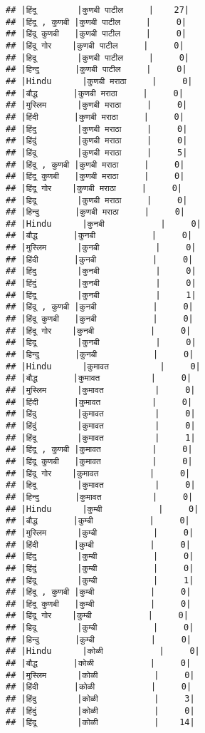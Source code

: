 \documentclass[
]{article}
\begin{document}
\begin{verbatim}
## |हिंदू        |कुणबी पाटील     |    27|
## |हिंदू , कुणबी |कुणबी पाटील     |     0|
## |हिंदू कुणबी   |कुणबी पाटील     |     0|
## |हिंदू गोर    |कुणबी पाटील     |     0|
## |हिदू        |कुणबी पाटील     |     0|
## |हिन्दु       |कुणबी पाटील     |     0|
## |Hindu      |कुणबी मराठा     |     0|
## |बौद्ध       |कुणबी मराठा     |     0|
## |मुस्लिम      |कुणबी मराठा     |     0|
## |हिंदी       |कुणबी मराठा     |     0|
## |हिंदु        |कुणबी मराठा     |     0|
## |हिंदुं        |कुणबी मराठा     |     0|
## |हिंदू        |कुणबी मराठा     |     5|
## |हिंदू , कुणबी |कुणबी मराठा     |     0|
## |हिंदू कुणबी   |कुणबी मराठा     |     0|
## |हिंदू गोर    |कुणबी मराठा     |     0|
## |हिदू        |कुणबी मराठा     |     0|
## |हिन्दु       |कुणबी मराठा     |     0|
## |Hindu      |कुनबी           |     0|
## |बौद्ध       |कुनबी           |     0|
## |मुस्लिम      |कुनबी           |     0|
## |हिंदी       |कुनबी           |     0|
## |हिंदु        |कुनबी           |     0|
## |हिंदुं        |कुनबी           |     0|
## |हिंदू        |कुनबी           |     1|
## |हिंदू , कुणबी |कुनबी           |     0|
## |हिंदू कुणबी   |कुनबी           |     0|
## |हिंदू गोर    |कुनबी           |     0|
## |हिदू        |कुनबी           |     0|
## |हिन्दु       |कुनबी           |     0|
## |Hindu      |कुमावत          |     0|
## |बौद्ध       |कुमावत          |     0|
## |मुस्लिम      |कुमावत          |     0|
## |हिंदी       |कुमावत          |     0|
## |हिंदु        |कुमावत          |     0|
## |हिंदुं        |कुमावत          |     0|
## |हिंदू        |कुमावत          |     1|
## |हिंदू , कुणबी |कुमावत          |     0|
## |हिंदू कुणबी   |कुमावत          |     0|
## |हिंदू गोर    |कुमावत          |     0|
## |हिदू        |कुमावत          |     0|
## |हिन्दु       |कुमावत          |     0|
## |Hindu      |कुम्बी           |     0|
## |बौद्ध       |कुम्बी           |     0|
## |मुस्लिम      |कुम्बी           |     0|
## |हिंदी       |कुम्बी           |     0|
## |हिंदु        |कुम्बी           |     0|
## |हिंदुं        |कुम्बी           |     0|
## |हिंदू        |कुम्बी           |     1|
## |हिंदू , कुणबी |कुम्बी           |     0|
## |हिंदू कुणबी   |कुम्बी           |     0|
## |हिंदू गोर    |कुम्बी           |     0|
## |हिदू        |कुम्बी           |     0|
## |हिन्दु       |कुम्बी           |     0|
## |Hindu      |कोळी           |     0|
## |बौद्ध       |कोळी           |     0|
## |मुस्लिम      |कोळी           |     0|
## |हिंदी       |कोळी           |     0|
## |हिंदु        |कोळी           |     3|
## |हिंदुं        |कोळी           |     0|
## |हिंदू        |कोळी           |    14|

\end{verbatim}
\end{document}
